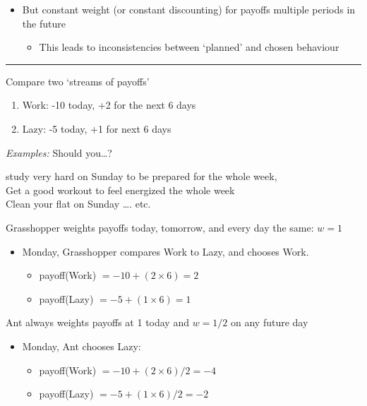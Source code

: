 \documentclass[]{article}
\providecommand{\tightlist}{%
  \setlength{\itemsep}{0pt}\setlength{\parskip}{0pt}}
\begin{document}
\bigskip

\begin{itemize}
\tightlist
\item
  But constant weight (or constant discounting) for payoffs multiple
  periods in the future

  \begin{itemize}
  \tightlist
  \item
    This leads to inconsistencies between `planned' and chosen behaviour
  \end{itemize}
\end{itemize}

\begin{center}\rule{0.5\linewidth}{\linethickness}\end{center}

Compare two `streams of payoffs'

\begin{enumerate}
\def\labelenumi{\arabic{enumi}.}
\item
  Work: -10 today, +2 for the next 6 days
\item
  Lazy: -5 today, +1 for next 6 days
\end{enumerate}

\emph{Examples:} Should you\ldots?

study very hard on Sunday to be prepared for the whole week,\\
Get a good workout to feel energized the whole week\\
Clean your flat on Sunday \ldots. etc.

\bigskip

Grasshopper weights payoffs today, tomorrow, and every day the same:
\(w=1\)

\begin{itemize}
\tightlist
\item
  Monday, Grasshopper compares Work to Lazy, and chooses Work.

  \begin{itemize}
  \tightlist
  \item
    payoff(Work) \(= -10 + (2 \times 6) = 2\)
  \item
    payoff(Lazy) \(= -5 + (1 \times 6) = 1\)
  \end{itemize}
\end{itemize}

\bigskip

Ant always weights payoffs at 1 today and \(w=1/2\) on any future day

\begin{itemize}
\tightlist
\item
  Monday, Ant chooses Lazy:

  \begin{itemize}
  \tightlist
  \item
    payoff(Work) \(= -10 +(2 \times 6)/2 = -4\)
  \item
    payoff(Lazy) \(= -5 + (1 \times 6)/2 = -2\)
  \end{itemize}
\end{itemize}
\end{document}
